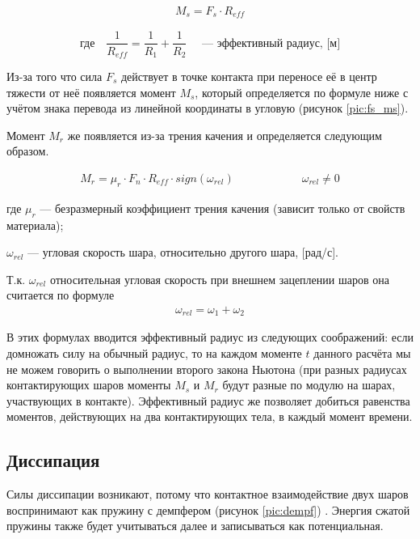 \documentclass[utf8x, 14pt, oneside, a4paper]{article}
\begin{document}
\begin{align}
\label{sliding_moment}
M_s = F_s \cdot R_{eff}
\end{align}

\[
\text{где} \quad \dfrac{1}{R_{eff}} = \dfrac{1}{R_1} + \dfrac{1}{R_2} \quad \text{ --- эффективный радиус, [м]}
\]

Из-за того что сила $F_s$ действует в точке контакта при переносе её в центр тяжести от неё появляется момент $M_s$, который определяется по формуле ниже с учётом знака перевода из линейной координаты в угловую (рисунок \ref{pic:fs_ms}).



Момент $M_r$ же появляется из-за трения качения и определяется следующим образом.

\begin{align}
\label{rolling_moment}
M_r = \mu_r \cdot F_n \cdot R_{eff} \cdot sign(\omega_{rel}) \qquad \qquad \qquad \omega_{rel} \neq 0
\end{align}

где $\mu_r$ --- безразмерный коэффициент трения качения (зависит только от свойств материала);

$\omega_{rel}$ --- угловая скорость шара, относительно другого шара, [рад/с].

Т.к. $\omega_{rel}$ относительная угловая скорость при внешнем зацеплении шаров она считается по формуле 
\begin{align}
\label{omega_rel}
\omega_{rel} = \omega_1 + \omega_2
\end{align}

В этих формулах вводится эффективный радиус из следующих соображений: если домножать силу на обычный радиус, то на каждом моменте $t$ данного расчёта мы не можем говорить о выполнении второго закона Ньютона (при разных радиусах контактирующих шаров моменты $M_s$ и $M_r$ будут разные по модулю на шарах, участвующих в контакте).
Эффективный радиус же позволяет добиться равенства моментов, действующих на два контактирующих тела, в каждый момент времени.


\subsection{Диссипация}
\label{dempf_subsection}

Силы диссипации возникают, потому что контактное взаимодействие двух шаров воспринимают как пружину с демпфером (рисунок \ref{pic:dempf}) \cite{pruzhina}. 
Энергия сжатой пружины также будет учитываться далее и записываться как потенциальная.
\end{document}
